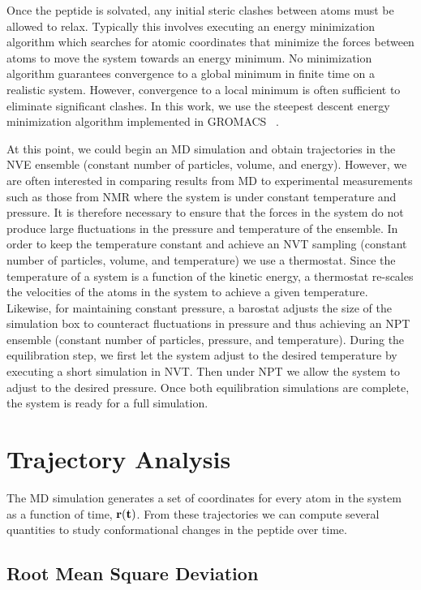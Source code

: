 Once the peptide is solvated, any initial steric clashes between atoms must be allowed to relax. Typically this involves executing an energy minimization algorithm which searches for atomic coordinates that minimize the forces between atoms to move the system towards an energy minimum. No minimization algorithm guarantees convergence to a global minimum in finite time on a realistic system. However, convergence to a local minimum is often sufficient to eliminate significant clashes. In this work, we use the steepest descent energy minimization algorithm implemented in GROMACS ~\cite{hess2008gromacs}. 

At this point, we could begin an MD simulation and obtain trajectories in the NVE ensemble (constant number of particles, volume, and energy). However, we are often interested in comparing results from MD to experimental measurements such as those from NMR where the system is under constant temperature and pressure. It is therefore necessary to ensure that the forces in the system do not produce large fluctuations in the pressure and temperature of the ensemble. In order to keep the temperature constant and achieve an NVT sampling (constant number of particles, volume, and temperature) we use a thermostat. Since the temperature of a system is a function of the kinetic energy, a thermostat re-scales the velocities of the atoms in the system to achieve a given temperature. Likewise, for maintaining constant pressure, a barostat adjusts the size of the simulation box to counteract fluctuations in pressure and thus achieving an NPT ensemble (constant number of particles, pressure, and temperature). During the equilibration step, we first let the system adjust to the desired temperature by executing a short simulation in NVT. Then under NPT we allow the system to adjust to the desired pressure. Once both equilibration simulations are complete, the system is ready for a full simulation.

\section{Trajectory Analysis}

The MD simulation generates a set of coordinates for every atom in the system as a function of time, $\mathbf{r(t)}$. From these trajectories we can compute several quantities to study conformational changes in the peptide over time. 

\subsection{Root Mean Square Deviation}

